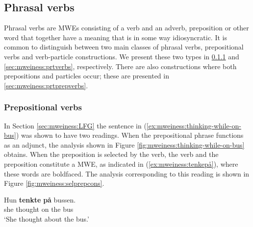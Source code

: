 \documentclass[output=paper]{langsci/langscibook}
\begin{document}
\subsection{Phrasal verbs}\label{sec:mweiness:phrasal}

Phrasal verbs are MWEs consisting of a verb and an adverb, preposition or other word that together have a meaning that is in some way idiosyncratic.
It is common to distinguish between two main classes of phrasal verbs, prepositional verbs and verb-particle constructions.
We present these two types in \ref{sec:mweiness:prepverbs} and \ref{sec:mweiness:prtverbs}, respectively.
There are also constructions where both prepositions and particles occur; these are presented in \ref{sec:mweiness:prtprepverbs}.

\subsubsection{Prepositional verbs}\label{sec:mweiness:prepverbs}

In Section \ref{sec:mweiness:LFG} the sentence in (\ref{ex:mweiness:thinking-while-on-bus}) was shown to have two readings.
When the prepositional phrase functions as an adjunct, the analysis shown in Figure \ref{fig:mweiness:thinking-while-on-bus} obtains.
When the preposition is selected by the verb, the verb and the preposition constitute a MWE, as indicated in (\ref{ex:mweiness:tenkepå}), where these words are boldfaced.
The analysis corresponding to this reading is shown in Figure \ref{fig:mweiness:selprepcons}.


\ea\label{ex:mweiness:tenkepå}
\gll Hun \textbf{tenkte} \textbf{på} bussen. \\
     she thought on {the bus}\\
\glt `She thought about the bus.'
\z

\end{document}

